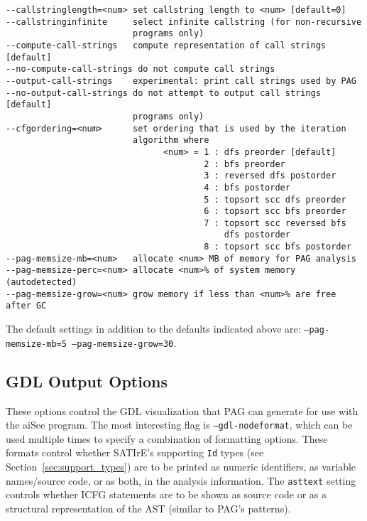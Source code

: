 \documentclass[a4paper,12pt]{report}
\begin{document}
{\footnotesize
\begin{verbatim}
--callstringlength=<num> set callstring length to <num> [default=0]
--callstringinfinite     select infinite callstring (for non-recursive
                         programs only)
--compute-call-strings   compute representation of call strings [default]
--no-compute-call-strings do not compute call strings
--output-call-strings    experimental: print call strings used by PAG
--no-output-call-strings do not attempt to output call strings [default]
                         programs only)
--cfgordering=<num>      set ordering that is used by the iteration
                         algorithm where
                               <num> = 1 : dfs preorder [default]
                                       2 : bfs preorder
                                       3 : reversed dfs postorder
                                       4 : bfs postorder
                                       5 : topsort scc dfs preorder
                                       6 : topsort scc bfs preorder
                                       7 : topsort scc reversed bfs
                                           dfs postorder
                                       8 : topsort scc bfs postorder
--pag-memsize-mb=<num>   allocate <num> MB of memory for PAG analysis
--pag-memsize-perc=<num> allocate <num>% of system memory (autodetected)
--pag-memsize-grow=<num> grow memory if less than <num>% are free after GC
\end{verbatim}
}

The default settings in addition to the defaults indicated above are:
\texttt{--pag-memsize-mb=5 --pag-memsize-grow=30}.

\subsection{GDL Output Options}

These options control the GDL visualization that PAG can generate for use
with the aiSee program. The most interesting flag is
\texttt{--gdl-nodeformat}, which can be used multiple times to specify a
combination of formatting options. These formats control whether SATIrE's
supporting \texttt{Id} types (see Section~\ref{sec:support_types}) are to be
printed as numeric identifiers, as variable names/source code, or as both,
in the analysis information. The \texttt{asttext} setting controls whether
ICFG statements are to be shown as source code or as a structural
representation of the AST (similar to PAG's patterns).
\end{document}
